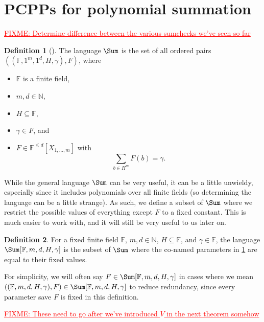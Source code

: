 \documentclass[english,12pt]{reedthesis}
\theoremstyle{plain}
\theoremstyle{definition}
\newtheorem{defn}[defn]{Definition}
\theoremstyle{remark}
\newcommand{\FIXME}[1]{\textcolor{red}{\ul{FIXME: #1}}}
\begin{document}
\section{PCPPs for polynomial summation}\label{sec:pcpp-poly-sum}

\FIXME{Determine difference between the various sumchecks we've seen so far}
\begin{defn}[{\cite[Def.\ 4.1]{GOS25}}]\label{def:sum-lang}
  The language $\Sum$ is the set of all ordered pairs
  $((\mathbb{F}, 1^{m}, 1^{d}, H, \gamma), F)$, where
  \begin{itemize}
    \item $\mathbb{F}$ is a finite field,
    \item $m, d \in \mathbb{N}$,
    \item $H \subseteq \mathbb{F}$,
    \item $\gamma \in F$, and
    \item $F \in \mathbb{F}^{\le d}[X_{1, \ldots, m}]$ with
          \[
            \sum_{b \in H^{m}}F(b) = \gamma.
          \]
  \end{itemize}
\end{defn}

While the general language $\Sum$ can be very useful, it can be a little
unwieldy, especially since it includes polynomials over all finite fields (so
determining the language can be a little strange). As such, we define a subset
of $\Sum$ where we restrict the possible values of everything except $F$ to a
fixed constant. This is much easier to work with, and it will still be very
useful to us later on.

\begin{defn}\label{def:sum-params}
  For a fixed finite field $\mathbb{F}$, $m, d \in \mathbb{N}$, $H \subseteq \mathbb{F}$, and
  $\gamma \in \mathbb{F}$, the language $\Sum[\mathbb{F}, m, d, H, \gamma]$ is the subset of
  $\Sum$ where the co-named parameters in \cref{def:sum-lang} are equal to their
  fixed values.
\end{defn}

For simplicity, we will often say $F \in \Sum[\mathbb{F}, m, d, H, \gamma]$ in cases
where we mean $((\mathbb{F}, m, d, H, \gamma), F) \in \Sum[\mathbb{F}, m, d, H, \gamma]$ to
reduce redundancy, since every parameter save $F$ is fixed in this definition.

\FIXME{These need to go after we've introduced $V$ in the next theorem somehow}
\end{document}
